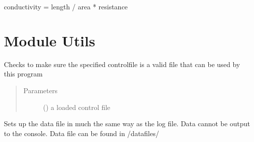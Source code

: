 \documentclass[letterpaper,10pt,english]{sphinxmanual}
\begin{document}

\begin{fulllineitems}
\label{\detokenize{plotting:plotting._calculate_conductivity}}
conductivity = length / area * resistance

\end{fulllineitems}



\chapter{Module Utils}
\label{\detokenize{utils:module-utils}}\label{\detokenize{utils:module-utils}}\label{\detokenize{utils::doc}}

\begin{fulllineitems}
\label{\detokenize{utils:utils.check_controlfile}}
Checks to make sure the specified controlfile is a valid file that can be used by this program
\begin{quote}\begin{description}
\item[{Parameters}] \leavevmode
{} () \textendash{} a loaded control file

\end{description}\end{quote}

\end{fulllineitems}


\begin{fulllineitems}
\label{\detokenize{utils:utils.data_logger}}
Sets up the data file in much the same way as the log file.
Data cannot be output to the console. Data file can be found in
/datafiles/

\end{fulllineitems}
\end{document}
